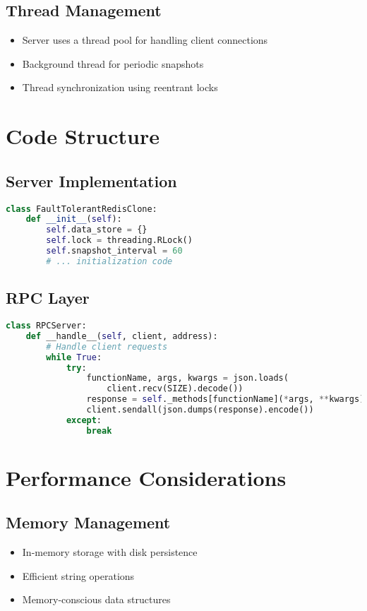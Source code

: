 \documentclass[11pt]{article}
\begin{document}
\subsection{Thread Management}
\begin{itemize}
    \item Server uses a thread pool for handling client connections
    \item Background thread for periodic snapshots
    \item Thread synchronization using reentrant locks
\end{itemize}

\section{Code Structure}

\subsection{Server Implementation}
\begin{lstlisting}[language=Python]
class FaultTolerantRedisClone:
    def __init__(self):
        self.data_store = {}
        self.lock = threading.RLock()
        self.snapshot_interval = 60
        # ... initialization code
\end{lstlisting}

\subsection{RPC Layer}
\begin{lstlisting}[language=Python]
class RPCServer:
    def __handle__(self, client, address):
        # Handle client requests
        while True:
            try:
                functionName, args, kwargs = json.loads(
                    client.recv(SIZE).decode())
                response = self._methods[functionName](*args, **kwargs)
                client.sendall(json.dumps(response).encode())
            except:
                break
\end{lstlisting}

\section{Performance Considerations}

\subsection{Memory Management}
\begin{itemize}
    \item In-memory storage with disk persistence
    \item Efficient string operations
    \item Memory-conscious data structures
\end{itemize}
\end{document}
